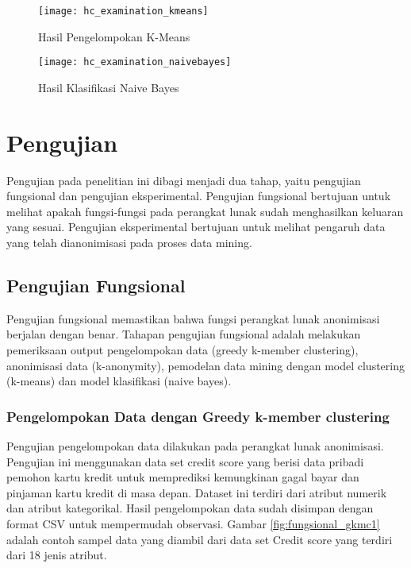 \begin{figure}[H]
	\centering
	\texttt{[image: hc\_examination\_kmeans]}
	\caption{Hasil Pengelompokan K-Means}
	\label{fig:pertama2}
\end{figure}

\begin{figure}[H]
	\centering
	\texttt{[image: hc\_examination\_naivebayes]}
	\caption{Hasil Klasifikasi Naive Bayes}
	\label{fig:pertama2}
\end{figure}

\section{Pengujian}
Pengujian pada penelitian ini dibagi menjadi dua tahap, yaitu pengujian fungsional dan pengujian eksperimental. Pengujian fungsional bertujuan untuk melihat apakah fungsi-fungsi pada perangkat lunak sudah menghasilkan keluaran yang sesuai. Pengujian eksperimental bertujuan untuk melihat pengaruh data yang telah dianonimisasi pada proses data mining.

\subsection{Pengujian Fungsional}
Pengujian fungsional memastikan bahwa fungsi perangkat lunak anonimisasi berjalan dengan benar. Tahapan pengujian fungsional adalah melakukan pemeriksaan output pengelompokan data (greedy k-member clustering), anonimisasi data (k-anonymity), pemodelan data mining dengan model clustering (k-means) dan model klasifikasi (naive bayes).

\subsubsection{Pengelompokan Data dengan Greedy k-member clustering}

Pengujian pengelompokan data dilakukan pada perangkat lunak anonimisasi. Pengujian ini menggunakan data set credit score yang berisi data pribadi  pemohon kartu kredit untuk memprediksi kemungkinan gagal bayar dan pinjaman kartu kredit di masa depan. Dataset ini terdiri dari atribut numerik dan atribut kategorikal. Hasil pengelompokan data sudah disimpan dengan format CSV untuk mempermudah observasi. Gambar \ref{fig:fungsional_gkmc1} adalah contoh sampel data yang diambil dari data set Credit score yang terdiri dari 18 jenis atribut.

